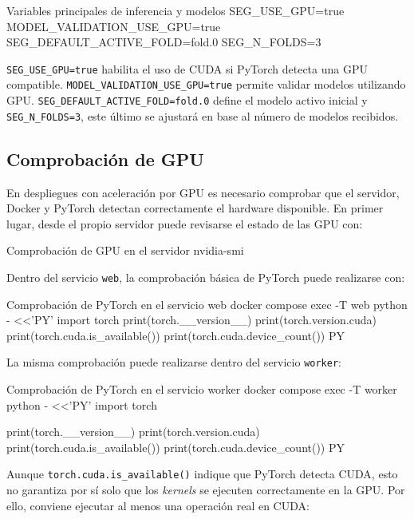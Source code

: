 \begin{infocmdbox}{Variables principales de inferencia y modelos}
SEG_USE_GPU=true
MODEL_VALIDATION_USE_GPU=true
SEG_DEFAULT_ACTIVE_FOLD=fold.0
SEG_N_FOLDS=3
\end{infocmdbox}

\texttt{SEG\_USE\_GPU=true} habilita el uso de CUDA si PyTorch detecta una GPU compatible. \texttt{MODEL\_VALIDATION\_USE\_GPU=true} permite validar modelos utilizando GPU. \texttt{SEG\_DEFAULT\_ACTIVE\_FOLD=fold.0} define el modelo activo inicial y \texttt{SEG\_N\_FOLDS=3}, este último se ajustará en base al número de modelos recibidos.

\subsection{Comprobación de GPU}

En despliegues con aceleración por GPU es necesario comprobar que el servidor, Docker y PyTorch detectan correctamente el hardware disponible. En primer lugar, desde el propio servidor puede revisarse el estado de las GPU con:

\begin{dockerbox}{Comprobación de GPU en el servidor}
nvidia-smi
\end{dockerbox}

Dentro del servicio \texttt{web}, la comprobación básica de PyTorch puede realizarse con:

\begin{dockerbox}{Comprobación de PyTorch en el servicio web}
docker compose exec -T web python - <<'PY'
import torch
print(torch.__version__)
print(torch.version.cuda)
print(torch.cuda.is_available())
print(torch.cuda.device_count())
PY
\end{dockerbox}

La misma comprobación puede realizarse dentro del servicio \texttt{worker}:

\begin{dockerbox}{Comprobación de PyTorch en el servicio worker}
docker compose exec -T worker python - <<'PY'
import torch

print(torch.__version__)
print(torch.version.cuda)
print(torch.cuda.is_available())
print(torch.cuda.device_count())
PY
\end{dockerbox}

Aunque \texttt{torch.cuda.is\_available()} indique que PyTorch detecta CUDA, esto no garantiza por sí solo que los \textit{kernels} se ejecuten correctamente en la GPU. Por ello, conviene ejecutar al menos una operación real en CUDA:

